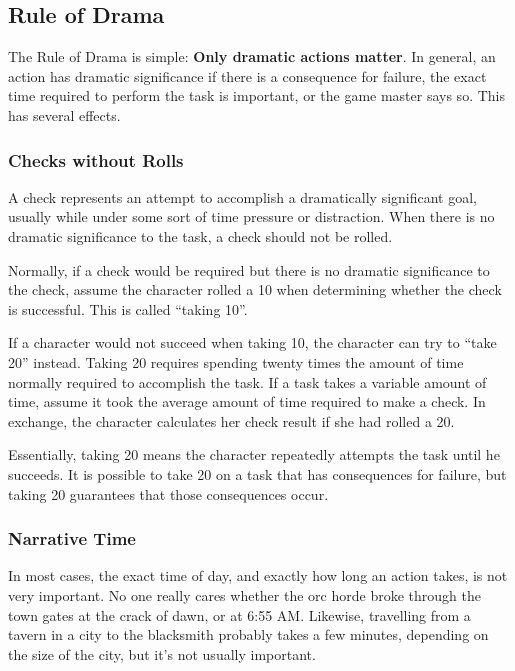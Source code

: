 \subsection{Rule of Drama}

The Rule of Drama is simple: \textbf{Only dramatic actions matter}.
In general, an action has dramatic significance if there is a consequence for failure, the exact time required to perform the task is important, or the game master says so.
This has several effects.

\subsubsection{Checks without Rolls}
A check represents an attempt to accomplish a dramatically significant goal, usually while under some sort of time pressure or distraction.
When there is no dramatic significance to the task, a check should not be rolled.

\label{Taking 10}
Normally, if a check would be required but there is no dramatic significance to the check, assume the character rolled a 10 when determining whether the check is successful.
This is called ``taking 10''.

\label{Taking 20}
If a character would not succeed when taking 10, the character can try to ``take 20'' instead.
Taking 20 requires spending twenty times the amount of time normally required to accomplish the task.
If a task takes a variable amount of time, assume it took the average amount of time required to make a check.
In exchange, the character calculates her check result if she had rolled a 20.

Essentially, taking 20 means the character repeatedly attempts the task until he succeeds.
It is possible to take 20 on a task that has consequences for failure, but taking 20 guarantees that those consequences occur.

\subsubsection{Narrative Time} In most cases, the exact time of day, and exactly how long an action takes, is not very important.
No one really cares whether the orc horde broke through the town gates at the crack of dawn, or at 6:55 AM.
Likewise, travelling from a tavern in a city to the blacksmith probably takes a few minutes, depending on the size of the city, but it's not usually important.

